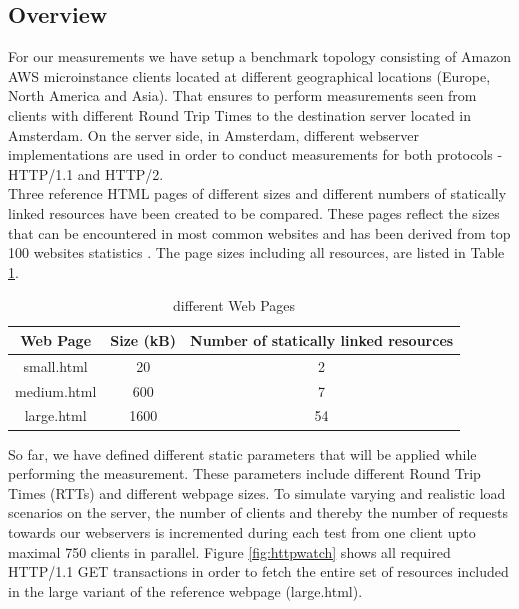 \subsection{Overview}
\label{subsec:topology}
For our measurements we have setup a benchmark topology consisting of Amazon AWS microinstance \cite{amazon} clients located at different geographical locations (Europe, North America and Asia). That ensures to perform measurements seen from clients with  different Round Trip Times to the destination server located in Amsterdam. On the server side, in Amsterdam, different webserver implementations are used in order to conduct measurements for both protocols - HTTP/1.1 and HTTP/2. 
\\
Three reference HTML pages of different sizes and different numbers of statically linked resources have been created to be compared. These pages reflect the sizes that can be encountered in most common websites and has been derived from top 100 websites statistics \cite{httparchive}. The page sizes including all resources, are listed in Table \ref{table:pages}.

\begin{table}[h]
	\centering
\begin{tabular}{ | c | c | c | }

\hline
Web Page & Size (kB) & Number of statically linked resources\\ \hline \hline
small.html &  20 & 2 \\ \hline
medium.html &  600 & 7\\ \hline 
large.html &  1600 & 54 \\
\hline
\end{tabular}
\caption{different Web Pages}
\label{table:pages}
\end{table}

So far, we have defined different static parameters that will be applied while performing the measurement. These parameters include different Round Trip Times (RTTs) and different webpage sizes. To simulate varying and realistic load scenarios on the server, the number of clients and thereby the number of requests towards our webservers is incremented during each test from one client upto maximal 750 clients in parallel. Figure \ref{fig:httpwatch} shows all required HTTP/1.1 GET transactions in order to fetch the entire set of resources included in the large variant of the reference webpage (large.html).

